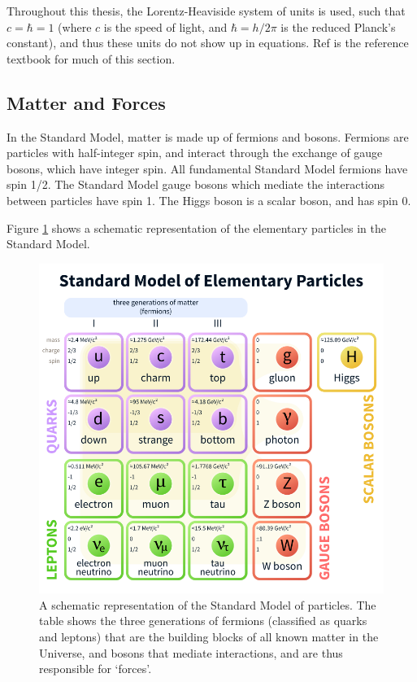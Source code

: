 \documentclass[11pt,a4paper,openright,twoside]{report}
\begin{document}
Throughout this thesis, the Lorentz-Heaviside system of units is used, such that $c=\hbar=1$ (where $c$ is the speed of light, and $\hbar=h/2\pi$ is the reduced Planck's constant), and thus these units do not show up in equations. Ref \cite{griff} is the reference textbook for much of this section.

\subsection{Matter and Forces}

In the Standard Model, matter is made up of fermions and bosons. Fermions are particles with half-integer spin, and interact through the exchange of gauge bosons, which have integer spin. All fundamental Standard Model fermions have spin 1/2. The Standard Model gauge bosons which mediate the interactions between particles have spin 1. The Higgs boson is a scalar boson, and has spin 0.

Figure \ref{fig:SM} shows a schematic representation of the elementary particles in the Standard Model.

\begin{figure}[H]
\centering
\includegraphics[width=0.8\linewidth]{standard_model.png}
\caption{A schematic representation of the Standard Model\cite{SM} of particles. The table shows the three generations of fermions (classified as quarks and leptons) that are the building blocks of all known matter in the Universe, and bosons that mediate interactions, and are thus responsible for `forces'.}
\label{fig:SM}
\end{figure}
\end{document}
